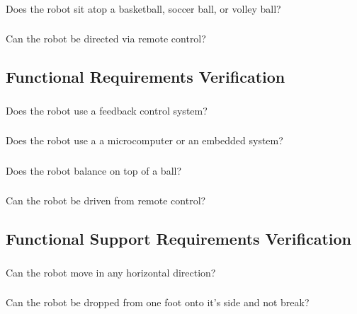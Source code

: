 \documentclass[12pt,a4paper]{article}
\begin{document}
\begin{flushleft}
				\subsubsection{} Does the robot sit atop a basketball, soccer ball, or volley ball?
				\subsubsection{} Can the robot be directed via remote control?
			\subsection{Functional Requirements Verification}
				\subsubsection{} Does the robot use a feedback control system?
				\subsubsection{} Does the robot use a a microcomputer or an embedded system?
				\subsubsection{} Does the robot balance on top of a ball?
				\subsubsection{} Can the robot be driven from remote control?
			\subsection{Functional Support Requirements Verification}
				\subsubsection{} Can the robot move in any horizontal direction?
				\subsubsection{} Can the robot be dropped from one foot onto it's side and not break?
		
	\end{flushleft}
\end{document}
